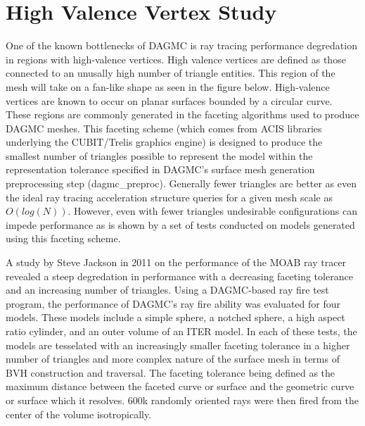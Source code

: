 \documentclass[12pt, a4paper]{article}
\begin{document}
\section{High Valence Vertex Study}%
\label{hv_study}

One of the known bottlenecks of DAGMC is ray tracing performance degredation in regions with high-valence vertices. High valence vertices are defined as those connected to an unusally high number of triangle entities. This region of the mesh will take on a fan-like shape as seen in the figure below. High-valence vertices are known to occur on planar surfaces bounded by a circular curve. These regions are commonly generated in the faceting algorithms used to produce DAGMC meshes. This faceting scheme (which comes from ACIS libraries underlying the CUBIT/Trelis graphics engine) is designed to produce the smallest number of triangles possible to represent the model within the representation tolerance specified in DAGMC's surface mesh generation preprocessing step (dagmc\_preproc). Generally fewer triangles are better as even the ideal ray tracing acceleration structure queries for a given mesh scale as $O(log(N))$. However, even with fewer triangles undesirable configurations can impede performance as is shown by a set of tests conducted on models generated using this faceting scheme.

A study by Steve Jackson in 2011 on the performance of the MOAB ray tracer revealed a steep degredation in performance with a decreasing faceting tolerance and an increasing number of triangles. Using a DAGMC-based ray fire test program, the performance of DAGMC's ray fire ability was evaluated for four models. These models include a simple sphere, a notched sphere, a high aspect ratio cylinder, and an outer volume of an ITER model. In each of these tests, the models are tesselated with an increasingly smaller faceting tolerance in a higher number of triangles and more complex nature of the surface mesh in terms of BVH construction and traversal. The faceting tolerance being defined as the maximum distance between the faceted curve or surface and the geometric curve or surface which it resolves. 600k randomly oriented rays were then fired from the center of the volume isotropically.
\end{document}
